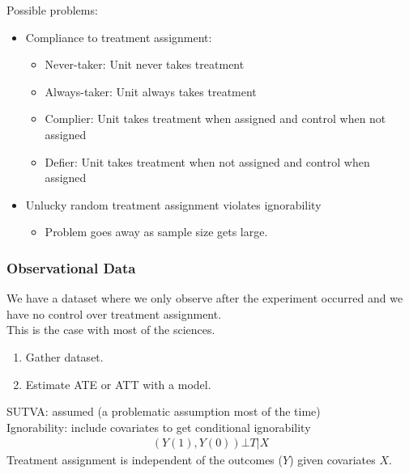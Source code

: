 \documentclass{beamer}
\begin{document}
\begin{frame}
Possible problems:
\pause
\bigskip
\begin{itemize}
\item Compliance to treatment assignment:
\pause
\begin{itemize}
\item Never-taker: Unit never takes treatment
\pause
\item Always-taker: Unit always takes treatment
\pause
\item Complier: Unit takes treatment when assigned and control when
not assigned
\pause
\item Defier: Unit takes treatment when not assigned and control when assigned
\end{itemize}
\pause
\bigskip
\item Unlucky random treatment assignment violates ignorability
\pause
\begin{itemize}
\item Problem goes away as sample size gets large.
\end{itemize}
\end{itemize}
\end{frame}

\begin{frame}
\frametitle{Observational Data}
\pause
We have a dataset where we only observe after the experiment occurred
and we have no control over treatment assignment. \\
\pause
\bigskip
This is the case with most of the sciences.
\pause
\bigskip
\begin{enumerate}
\item Gather dataset.
\pause
\item Estimate ATE or ATT with a model.
\end{enumerate}
\pause
\bigskip
SUTVA: assumed (a problematic assumption most of the time) \\
\pause
\bigskip
Ignorability: include covariates to get
conditional ignorability
\pause
\begin{eqnarray*}
(Y(1), Y(0)) \bot T | X
\end{eqnarray*}
\pause
Treatment assignment is independent of the outcomes ($Y$) given
covariates $X$.
\end{frame}
\end{document}
